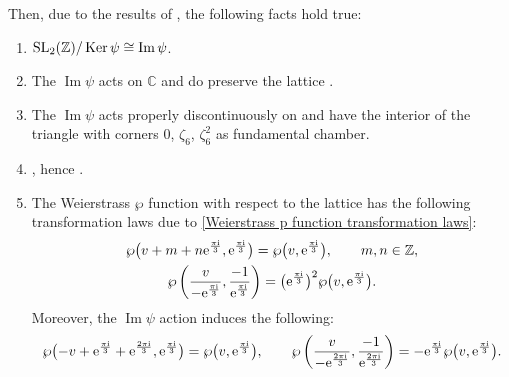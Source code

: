 \documentclass[pdftex]{sigma}
\numberwithin{equation}{section}
\begin{document}
Then, due to the results of \cite[Section 1 and 2]{M.Batchelor}, the following facts hold true:
\begin{enumerate}\itemsep=0pt
\item[(1)] ${\rm SL}_2(\mathbb{Z})/\operatorname{Ker}\psi\cong \operatorname{Im}\psi$.
\item[(2)] The $\operatorname{Im}\psi$ acts on $\mathbb{C}$ and do preserve the lattice .
\item[(3)] The $\operatorname{Im}\psi$ acts properly discontinuously on  and have the interior of the triangle with corners $0$, $\zeta_6$, $\zeta_6^2$ as fundamental chamber.
\item[(4)] , hence .
\item[(5)] The Weierstrass $\wp$ function with respect to the lattice  has the following transformation laws due to \eqref{Weierstrass p function transformation laws}:
 \begin{gather*}
\wp\bigl(v+m+n{\rm e}^{\frac{\pi {\rm i}}{3}},{\rm e}^{\frac{\pi {\rm i}}{3}}\bigr)=\wp\bigl(v,{\rm e}^{\frac{\pi {\rm i}}{3}}\bigr),\qquad m,n \in\mathbb{Z},\\
\wp\left(\frac{v}{-{\rm e}^{\frac{\pi {\rm i}}{3}}},\frac{-1}{{\rm e}^{\frac{\pi {\rm i}}{3}}}\right)=\bigl({\rm e}^{\frac{\pi {\rm i}}{3}}\bigr)^2\wp\bigl(v,{\rm e}^{\frac{\pi {\rm i}}{3}}\bigr).
\end{gather*}
Moreover, the $\operatorname{Im} \psi$ action induces the following:
 \begin{gather*}
\wp\bigl(-v+{\rm e}^{\frac{\pi {\rm i}}{3}}+{\rm e}^{\frac{2\pi {\rm i}}{3}},{\rm e}^{\frac{\pi {\rm i}}{3}}\bigr)=\wp\bigl(v,{\rm e}^{\frac{\pi {\rm i}}{3}}\bigr),\qquad
\wp\left(\frac{v}{-{\rm e}^{\frac{2\pi {\rm i}}{3}}},\frac{-1}{{\rm e}^{\frac{2\pi {\rm i}}{3}}}\right)=-{\rm e}^{\frac{\pi {\rm i}}{3}}\wp\bigl(v,{\rm e}^{\frac{\pi {\rm i}}{3}}\bigr).
\end{gather*}


\end{enumerate}
\end{document}
